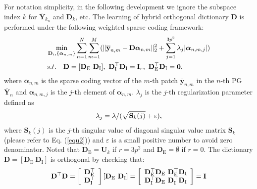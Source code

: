 \documentclass[10pt,twocolumn,letterpaper]{article}
\begin{document}
For notation simplicity, in the following development we ignore the subspace index $k$ for $\mathbf{\overline{Y}}_{k_{n}}$ and $\mathbf{D}_{k}$, etc. The learning of hybrid orthogonal dictionary $\mathbf{D}$ is performed under the following weighted sparse coding
framework:
\vspace{-2mm}
\begin{equation}\label{equ4}\vspace{-3mm}
\begin{split}
&\min_{\mathbf{D}_{i},\{\bm{\alpha}_{n,m}\}}
\sum_{n=1}^{N}\sum_{m=1}^{M}(\|\mathbf{\overline{y}}_{n,m}-\mathbf{D}\bm{\alpha}_{n,m}\|_{2}^{2}+\sum_{j=1}^{3p^{2}}\lambda_{j}|\bm{\alpha}_{n,m,j}|)
\\
&
s.t.
\quad
\mathbf{D}=[\mathbf{D}_{\text{E}}\ \mathbf{D}_{\text{I}}],\ \mathbf{D}_{\text{I}}^{\top}\mathbf{D}_{\text{I}} = \mathbf{I}_{r},\ \mathbf{D}_{\text{E}}^{\top}\mathbf{D}_{\text{I}} = \mathbf{0},
\end{split}
\end{equation}
where $\bm{\alpha}_{n,m}$ is the sparse coding vector of the $m$-th patch $\mathbf{\overline{y}}_{n,m}$ in the $n$-th PG $\mathbf{\overline{Y}}_{n}$ and $\bm{\alpha}_{n,m,j}$ is the $j$-th element of $\bm{\alpha}_{n,m}$. $\lambda_{j}$ is the $j$-th regularization parameter defined as
\vspace{-1mm}
\begin{equation}\label{equ5}\vspace{-1mm}
\lambda_{j} = \lambda/(\sqrt{\mathbf{S}_{k}(j)}+\varepsilon),
\end{equation}
where $\mathbf{S}_{k}(j)$ is the $j$-th singular value of diagonal singular value matrix $\mathbf{S}_{k}$ (please refer to Eq. (\ref{equ2})) and $\varepsilon$ is a small positive number to avoid zero denominator. Noted that $\mathbf{D}_{\text{E}}=\mathbf{U}_{k}$ if $r=3p^{2}$ and $\mathbf{D}_{\text{E}}=\emptyset$ if $r=0$. The dictionary $\mathbf{D} = [\mathbf{D}_{\text{E}}\ \mathbf{D}_{\text{I}}]$ is orthogonal by checking that:
\vspace{-2mm}
\begin{equation}\label{equ6}\vspace{-1mm}
\mathbf{D}^{\top}\mathbf{D} = 
\left[\begin{array}{c}
\mathbf{D}_{\text{E}}^{\top}
\\
\mathbf{D}_{\text{I}}^{\top}
\end{array}\right]
[\mathbf{D}_{\text{E}}\ \mathbf{D}_{\text{I}}]
=
\left[\begin{array}{cc}
\mathbf{D}_{\text{E}}^{\top}\mathbf{D}_{\text{E}}\ \mathbf{D}_{\text{E}}^{\top}\mathbf{D}_{\text{I}}
\\
\mathbf{D}_{\text{I}}^{\top}\mathbf{D}_{\text{E}}\ \mathbf{D}_{\text{I}}^{\top}\mathbf{D}_{\text{I}}
\end{array}\right]
=
\mathbf{I}
\end{equation}
\end{document}
